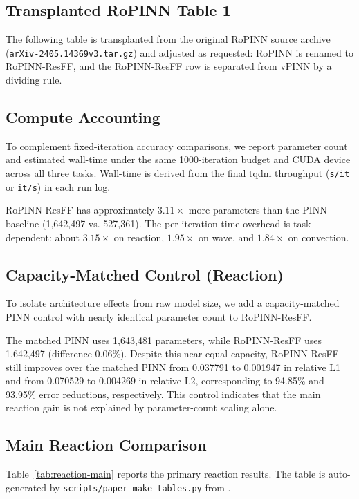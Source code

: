 \subsection{Transplanted RoPINN Table 1}
The following table is transplanted from the original RoPINN source archive (\texttt{arXiv-2405.14369v3.tar.gz}) and adjusted as requested: RoPINN is renamed to RoPINN-ResFF, and the RoPINN-ResFF row is separated from vPINN by a dividing rule.



\subsection{Compute Accounting}
To complement fixed-iteration accuracy comparisons, we report parameter count and estimated wall-time under the same 1000-iteration budget and CUDA device across all three tasks. Wall-time is derived from the final tqdm throughput (\texttt{s/it} or \texttt{it/s}) in each run log.



RoPINN-ResFF has approximately $3.11\times$ more parameters than the PINN baseline (1,642,497 vs. 527,361). The per-iteration time overhead is task-dependent: about $3.15\times$ on reaction, $1.95\times$ on wave, and $1.84\times$ on convection.

\subsection{Capacity-Matched Control (Reaction)}
To isolate architecture effects from raw model size, we add a capacity-matched PINN control with nearly identical parameter count to RoPINN-ResFF.



The matched PINN uses 1,643,481 parameters, while RoPINN-ResFF uses 1,642,497 (difference 0.06\%). Despite this near-equal capacity, RoPINN-ResFF still improves over the matched PINN from 0.037791 to 0.001947 in relative L1 and from 0.070529 to 0.004269 in relative L2, corresponding to 94.85\% and 93.95\% error reductions, respectively. This control indicates that the main reaction gain is not explained by parameter-count scaling alone.

\subsection{Main Reaction Comparison}
Table~\ref{tab:reaction-main} reports the primary reaction results. The table is auto-generated by \texttt{scripts/paper\_make\_tables.py} from .

